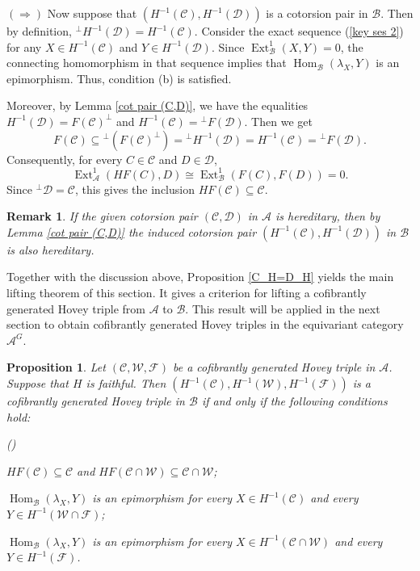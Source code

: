 \documentclass[12pt,twoside]{amsart}
\theoremstyle{bfupright head,slanted body}
\theoremstyle{bfupright head,upright body}
\theoremstyle{fixed bf head,slanted body}
\newtheorem{prp}[res]{Proposition}      \newtheorem*{prp*}{Proposition}
\theoremstyle{fixed bf head,upright body}
\newtheorem{rmk}[res]{Remark}           \newtheorem*{rmk*}{Remark}
\theoremstyle{numbered paragraph}
\newlength{\thmlistleft}        %
\newlength{\thmlistright}       %
\newlength{\thmlistpartopsep}   %
\newlength{\thmlisttopsep}      %
\newlength{\thmlistparsep}      %
\newlength{\thmlistitemsep}     %
\newcounter{prt}
\newenvironment{prt}{\begin{list}{\upshape (\alph{prt})}%
    {\usecounter{prt}%
      \setlength{\leftmargin}{\thmlistleft}%
      \setlength{\labelwidth}{\thmlistleft}%
      \setlength{\rightmargin}{\thmlistright}%
      \setlength{\partopsep}{\thmlistpartopsep}%
      \setlength{\topsep}{\thmlisttopsep}%
      \setlength{\parsep}{\thmlistparsep}%
      \setlength{\itemsep}{\thmlistitemsep}}}%
  {\end{list}}%
\newenvironment{prf*}[1][Proof]{%
  \begin{proof}[\bf #1]
    \setcounter{equation}{0}
    \renewcommand{\theequation}{\arabic{equation}}}
  {\end{proof}
}
\numberwithin{equation}{res}
\newcommand{\calC}{\mathcal{C}}
\newcommand{\calW}{\mathcal{W}}
\newcommand{\calF}{\mathcal{F}}
\newcommand{\calA}{\mathcal{A}}
\newcommand{\calB}{\mathcal{B}}
\newcommand{\calD}{\mathcal{D}}
\newcommand{\Hom}{\operatorname{Hom}}
\newcommand{\Ext}{\operatorname{Ext}}
\begin{document}
\begin{prf*}
$(\Rightarrow)$
Now suppose that \((H^{-1}(\calC),H^{-1}(\calD))\) is a cotorsion pair in \(\calB\).
Then by definition, \({^\bot H^{-1}(\calD)}=H^{-1}(\calC)\).
Consider the exact sequence (\ref{key ses 2}) for any \(X\in H^{-1}(\calC)\) and \(Y\in H^{-1}(\calD)\).
Since \(\Ext_\calB^1(X,Y)=0\), the connecting homomorphism in that sequence implies that \(\Hom_\calB(\lambda_X,Y)\) is an epimorphism.
Thus, condition (b) is satisfied.

Moreover, by Lemma \ref{cot pair (C,D)}, we have the equalities
\(H^{-1}(\calD)=F(\calC)^\perp\) and \(H^{-1}(\calC)={^\bot F(\calD)}\).
Then we get
\[
F(\calC) \subseteq {^\bot(F(\calC)^\bot)} = {^\bot H^{-1}(\calD)} = H^{-1}(\calC) = {^\bot F(\calD)}.
\]
Consequently, for every \(C\in\calC\) and \(D\in\calD\),
\[
\Ext_\calA^1(HF(C),D) \cong \Ext_\calB^1(F(C),F(D))=0.
\]
Since \({^\bot\calD}=\calC\), this gives the inclusion \(HF(\calC)\subseteq\calC\).
\end{prf*}

\begin{rmk}\label{here for cp}
If the given cotorsion pair \((\calC,\calD)\) in \(\calA\) is hereditary, then by Lemma \ref{cot pair (C,D)} the induced cotorsion pair \((H^{-1}(\calC),H^{-1}(\calD))\) in \(\calB\) is also hereditary.
\end{rmk}

Together with the discussion above, Proposition \ref{C_H=D_H} yields the main lifting theorem of this section. It gives a criterion for lifting a cofibrantly generated Hovey triple from \(\mathcal A\) to \(\mathcal B\). This result will be applied in the next section to obtain cofibrantly generated Hovey triples in the equivariant category \(\calA^G\).

\begin{prp} \label{HOVEY case0}
Let \((\calC,\calW,\calF)\) be a cofibrantly generated Hovey triple in \(\calA\).
Suppose that \(H\) is faithful.
Then \((H^{-1}(\calC),H^{-1}(\calW),H^{-1}(\calF))\) is a cofibrantly generated Hovey triple in \(\calB\) if and only if the following conditions hold:
\begin{prt}
\item \(HF(\calC)\subseteq\calC\) and \(HF(\calC\cap\calW)\subseteq\calC\cap\calW\);
\item \(\Hom_\calB(\lambda_X,Y)\) is an epimorphism for every \(X\in H^{-1}(\calC)\) and every \(Y\in H^{-1}(\calW\cap\calF)\);
\item \(\Hom_\calB(\lambda_X,Y)\) is an epimorphism for every \(X\in H^{-1}(\calC\cap\calW)\) and every \(Y\in H^{-1}(\calF)\).
\end{prt}
\end{prp}
\end{document}
